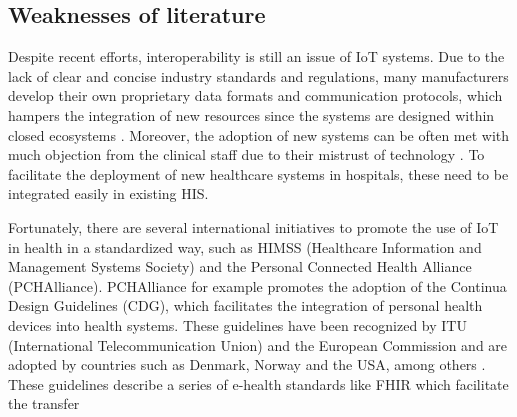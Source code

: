 \clearpage
\subsection{Weaknesses of literature}
\label{sec:weaknesses}


% 

Despite recent efforts, interoperability is still an issue of \acs{IoT} systems. Due to the lack of clear and concise industry standards and regulations, many manufacturers develop their own proprietary data formats and communication protocols, which hampers the integration of new resources since the systems are designed within closed ecosystems \cite{Rubi2019}. Moreover, the adoption of new systems can be often met with much objection from the clinical staff due to their mistrust of technology \cite{DursunErgezen2020}. 
To facilitate the deployment of new healthcare systems in hospitals, these need to be integrated easily in existing \acs{HIS}. \bigskip

Fortunately, there are several international initiatives to promote the use of \acs{IoT} in health in a standardized way, such as HIMSS (Healthcare Information and Management Systems Society) and the Personal Connected Health Alliance (PCHAlliance). PCHAlliance for example promotes the adoption of the Continua Design Guidelines (CDG), which facilitates the integration of personal health devices into health systems. These guidelines have been recognized by ITU (International Telecommunication Union) and the European Commission and are adopted by countries such as Denmark, Norway and the USA, among others \cite{PersonalConnectedHealthAlliance2017}. These guidelines describe a series of e-health standards like \acs{FHIR} which facilitate the transfer  

